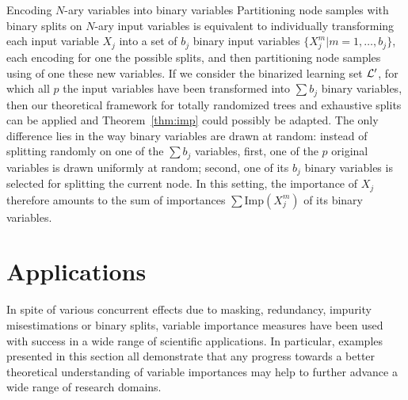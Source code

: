 \begin{remark}{Encoding $N$-ary variables into binary variables}
Partitioning node samples with binary splits on $N$-ary input variables is
equivalent to individually transforming each input variable $X_j$ into a set of
$b_j$ binary input variables $\{X_j^{m} | m=1,\dots,b_j\}$, each encoding for
one the possible splits, and then partitioning node samples using of one these new
variables. If we consider the binarized learning set ${\cal L}^\prime$, for
which all $p$ the input variables have been transformed into $\sum b_j$ binary
variables, then our theoretical framework for totally randomized trees and
exhaustive splits can be applied and Theorem~\ref{thm:imp} could possibly be
adapted. The only difference lies in the way binary variables are drawn at
random:  instead of splitting randomly on one of the $\sum b_j$ variables,
first, one of the $p$ original variables is drawn uniformly at random; second, one of
its $b_j$ binary variables is selected for splitting the current node. In this
setting, the importance of $X_j$ therefore amounts to the sum of importances $\sum
\text{Imp}(X_j^m)$ of its binary variables. \end{remark}

\section{Applications}
\label{sec:7:applications}

In spite of various concurrent effects due to masking, redundancy, impurity
misestimations or binary splits, variable importance measures have been used
with success in a wide range of scientific applications. In particular,
examples presented in this section all demonstrate that any progress towards a
better theoretical understanding of variable importances may help to further
advance a wide range of research domains.

